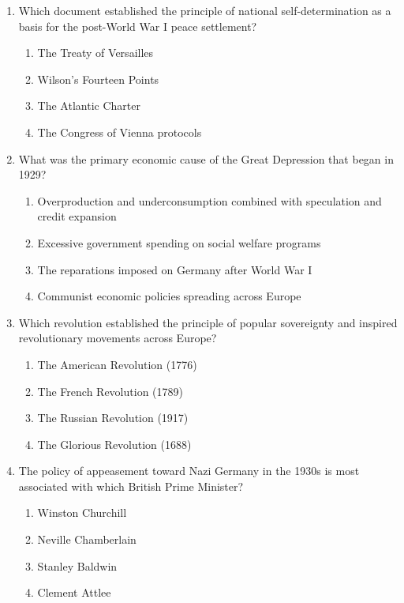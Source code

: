 \documentclass[11pt]{article}
\begin{document}
\begin{enumerate}[label=\textbf{\arabic*.}]

  \item Which document established the principle of national self-determination as a basis for 
  the post-World War I peace settlement?
  \begin{enumerate}[label=(\Alph*)]
    \item The Treaty of Versailles
    \item Wilson's Fourteen Points
    \item The Atlantic Charter
    \item The Congress of Vienna protocols
  \end{enumerate}

  \item What was the primary economic cause of the Great Depression that began in 1929?
  \begin{enumerate}[label=(\Alph*)]
    \item Overproduction and underconsumption combined with speculation and credit expansion
    \item Excessive government spending on social welfare programs
    \item The reparations imposed on Germany after World War I
    \item Communist economic policies spreading across Europe
  \end{enumerate}

  \item Which revolution established the principle of popular sovereignty and inspired revolutionary 
  movements across Europe?
  \begin{enumerate}[label=(\Alph*)]
    \item The American Revolution (1776)
    \item The French Revolution (1789)
    \item The Russian Revolution (1917)
    \item The Glorious Revolution (1688)
  \end{enumerate}

  \item The policy of appeasement toward Nazi Germany in the 1930s is most associated with which 
  British Prime Minister?
  \begin{enumerate}[label=(\Alph*)]
    \item Winston Churchill
    \item Neville Chamberlain
    \item Stanley Baldwin
    \item Clement Attlee
  \end{enumerate}


\end{enumerate}
\end{document}
